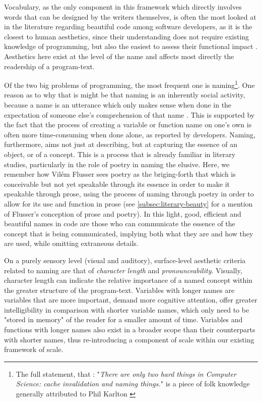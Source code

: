 Vocabulary, as the only component in this framework which directly involves words that can be designed by the writers themselves, is often the most looked at in the literature regarding beautiful code among software developers, as it is the closest to human aesthetics, since their understanding does not require existing knowledge of programming, but also the easiest to assess their functional impact \citep{oliveira_systematic_2022}. Aesthetics here exist at the level of the name and affects most directly the readership of a program-text.

Of the two big problems of programming, the most frequent one is naming\footnote{The full statement, that : "\emph{There are only two hard things in Computer Science: cache invalidation and naming things.}" is a piece of folk knowledge generally attributed to Phil Karlton \citep{fowler_twohardthings_2009}}. One reason as to why that is might be that naming is an inherently social activity, because a name is an utterance which only makes sense when done in the expectation of someone else's comprehension of that name \citep{voloshinov_marxism_1986}. This is supported by the fact that the process of creating a variable or function name on one's own is often more time-consuming when done alone, as reported by developers. Naming, furthermore, aims not just at describing, but at capturing the essence of an object, or of a concept. This is a process that is already familiar in literary studies, particularly in the role of poetry in naming the elusive. Here, we remember how Vilém Flusser sees poetry as the briging-forth that which is conceivable but not yet speakable through its essence in order to make it speakable through prose, using the process of naming through poetry in order to allow for its use and function in prose (see \ref{subsec:literary-beauty} for a mention of Flusser's conception of prose and poetry). In this light, good, efficient and beautiful names in code are those who can communicate the essence of the concept that is being communicated, implying both what they are and how they are used, while omitting extraneous details.


On a purely sensory level (visual and auditory), surface-level aesthetic criteria related to naming are that of \emph{character length} and \emph{pronounceability}. Visually, character length can indicate the relative importance of a named concept within the greater structure of the program-text. Variables with longer names are variables that are more important, demand more cognitive attention, offer greater intelligibility in comparison with shorter variable names, which only need to be "stored in memory" of the reader for a smaller amount of time. Variables and functions with longer names also exist in a broader scope than their counterparts with shorter names, thus re-introducing a component of scale within our existing framework of scale.

